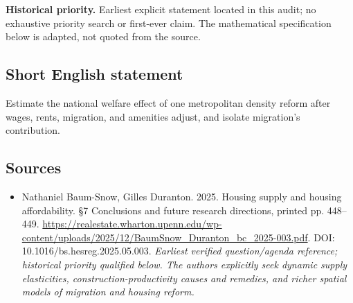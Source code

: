 \documentclass[11pt]{article}
\begin{document}
\par\textbf{Historical priority.} Earliest explicit statement located in this audit; no exhaustive priority search or first-ever claim. The mathematical specification below is adapted, not quoted from the source.

\subsection{Short English statement}
Estimate the national welfare effect of one metropolitan density reform after wages, rents, migration, and amenities adjust, and isolate migration’s contribution.

\subsection{Sources}
\begin{itemize}\raggedright
\item[\textnormal{[S1]}]\hypertarget{source:30007743:1}{} Nathaniel Baum-Snow, Gilles Duranton. 2025. Housing supply and housing affordability. §7 Conclusions and future research directions, printed pp. 448–449.
\url{https://realestate.wharton.upenn.edu/wp-content/uploads/2025/12/BaumSnow_Duranton_bc_2025-003.pdf}.
DOI: 10.1016/bs.hesreg.2025.05.003.
{\small\textit{Earliest verified question/agenda reference; historical priority qualified below. The authors explicitly seek dynamic supply elasticities, construction-productivity causes and remedies, and richer spatial models of migration and housing reform.}}
\end{itemize}
\end{document}
